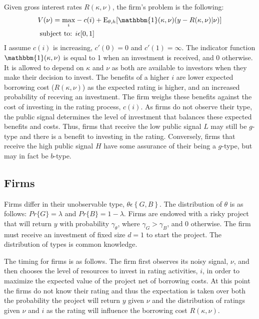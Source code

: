 \documentclass[notitlepage]{article}
\begin{document}
Given gross interest rates $R(\kappa,\nu)$, the firm's problem is the following:
\begin{align}
\label{eq:FP} V(\nu)=\max_{i} & -c(i)+\textup{E}_{\theta,h} [ \mathbbm{1}(\kappa,\nu) (y - R(\kappa,\nu)|\nu ) ]\\
\textup{subject to: } & i\epsilon [0,1] \nonumber
\end{align}
I assume $c(i)$ is increasing, $c'(0)=0$ and $c'(1)=\infty$. The indicator function $\mathbbm{1}(\kappa,\nu)$ is equal to 1 when an investment is received, and 0 otherwise. It is allowed to depend on $\kappa$ and $\nu$ as both are available to investors when they make their decision to invest. The benefits of a higher $i$ are lower expected borrowing cost ($R(\kappa,\nu)$) as the expected rating is higher, and an increased probability of receving an investment. The firm weighs these benefits against the cost of investing in the rating process, $c(i)$. As firms do not observe their type, the public signal determines the level of investment that balances these expected benefits and costs. Thus, firms that receive the low public signal $L$ may still be $g$-type and there is a benefit to investing in the rating. Conversely, firms that receive the high public signal $H$ have some assurance of their being a $g$-type, but may in fact be $b$-type. 

\subsection{Firms}
Firms differ in their unobservable type, $\theta \epsilon \left\{G,B\right\}$. The distribution of $\theta$ is as follows: $Pr\{G\}=\lambda$ and $Pr\{B\}=1-\lambda$. Firms are endowed with a risky project that will return $y$ with probability $\gamma_{\theta}$, where $\gamma_{G}>\gamma_{B}$, and 0 otherwise. The firm must receive an investment of fixed size $d=1$ to start the project. The distribution of types is common knowledge. 

The timing for firms is as follows. The firm first observes its noisy signal, $\nu$, and then chooses the level of resources to invest in rating activities, $i$, in order to maximize the expected value of the project net of borrowing costs. At this point the firms do not know their rating and thus the expectation is taken over both the probability the project will return $y$ given $\nu$ and the distribution of ratings given $\nu$ and $i$ as the rating will influence the borrowing cost $R(\kappa,\nu)$.
\end{document}
